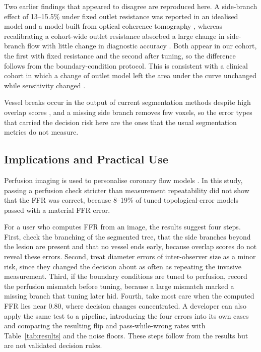\documentclass[journal]{IEEEtran}
\begin{document}
Two earlier findings that appeared to disagree are reproduced here. A side-branch effect of 13--15.5\% under fixed outlet resistance was reported in an idealised model and a model built from optical coherence tomography \cite{gamage2022}, whereas recalibrating a cohort-wide outlet resistance absorbed a large change in side-branch flow with little change in diagnostic accuracy \cite{gosling2020}. Both appear in our cohort, the first with fixed resistance and the second after tuning, so the difference follows
from the boundary-condition protocol. This is consistent with a clinical cohort in which a change of outlet model left
the area under the curve unchanged while sensitivity changed \cite{fossan2026}.

Vessel breaks occur in the output of current segmentation methods despite high overlap scores \cite{bransby2026},
and a missing side branch removes few voxels, so the error types that carried the decision risk here are the ones
that the usual segmentation metrics do not measure.

\subsection{Implications and Practical Use}
Perfusion imaging is used to personalise coronary flow models \cite{menon2024}. In this study, passing a perfusion
check stricter than measurement repeatability did not show that the FFR was correct, because 8--19\% of tuned
topological-error models passed with a material FFR error.

For a user who computes FFR from an image, the results suggest four steps. First, check the branching of the
segmented tree, that the side branches beyond the lesion are present and that no vessel ends early, because overlap
scores do not reveal these errors. Second, treat diameter errors of inter-observer size as a minor risk, since they
changed the decision about as often as repeating the invasive measurement. Third, if the boundary conditions are
tuned to perfusion, record the perfusion mismatch before tuning, because a large mismatch marked a missing branch
that tuning later hid. Fourth, take most care when the computed FFR lies near 0.80, where decision changes
concentrated. A developer can also apply the same test to a pipeline, introducing the four errors into its own cases
and comparing the resulting flip and pass-while-wrong rates with Table~\ref{tab:results} and the noise floors. These
steps follow from the results but are not validated decision rules.
\end{document}
